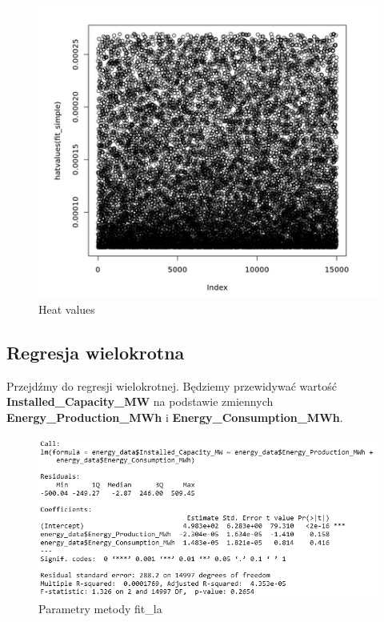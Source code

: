 \begin{figure}[H]
    \centering
    \includegraphics[width=1\linewidth]{lab1/obraz6.png}
    \caption{Heat values}
    \label{fig:heat_values}
\end{figure}

\subsection{Regresja wielokrotna}
Przejdźmy do regresji wielokrotnej. Będziemy przewidywać wartość \textbf{Installed\_Capacity\_MW} na podstawie zmiennych \textbf{Energy\_Production\_MWh} i \textbf{Energy\_Consumption\_MWh}.


\begin{figure}[H]
    \centering
    \includegraphics[width=1\linewidth]{lab1/obraz9.png}
    \caption{Parametry metody fit\_la}
    \label{fig:enter-label}
\end{figure}

